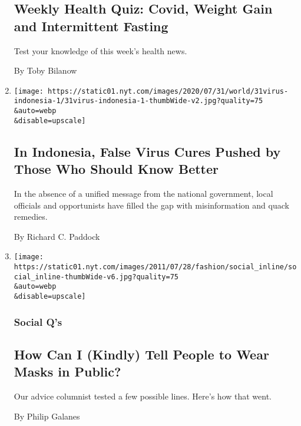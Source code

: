 \begin{enumerate}
  \hypertarget{weekly-health-quiz-covid-weight-gain-and-intermittent-fasting-1}{%
  \subsection{Weekly Health Quiz: Covid, Weight Gain and Intermittent
  Fasting}\label{weekly-health-quiz-covid-weight-gain-and-intermittent-fasting-1}}

  Test your knowledge of this week's health news.

  By Toby Bilanow
\item
  \href{/2020/07/31/world/asia/indonesia-coronavirus.html}{}

  \texttt{[image: https://static01.nyt.com/images/2020/07/31/world/31virus-indonesia-1/31virus-indonesia-1-thumbWide-v2.jpg?quality=75\\\&auto=webp\\\&disable=upscale]}

  \hypertarget{in-indonesia-false-virus-cures-pushed-by-those-who-should-know-better}{%
  \subsection{In Indonesia, False Virus Cures Pushed by Those Who Should
  Know
  Better}\label{in-indonesia-false-virus-cures-pushed-by-those-who-should-know-better}}

  In the absence of a unified message from the national government,
  local officials and opportunists have filled the gap with
  misinformation and quack remedies.

  By Richard C. Paddock
\item
  \href{/2020/07/30/style/masks-in-public-coronavirus.html}{}

  \texttt{[image: https://static01.nyt.com/images/2011/07/28/fashion/social\_inline/social\_inline-thumbWide-v6.jpg?quality=75\\\&auto=webp\\\&disable=upscale]}

  \hypertarget{social-qs}{%
  \subsubsection{Social Q's}\label{social-qs}}

  \hypertarget{how-can-i-kindly-tell-people-to-wear-masks-in-public}{%
  \subsection{How Can I (Kindly) Tell People to Wear Masks in
  Public?}\label{how-can-i-kindly-tell-people-to-wear-masks-in-public}}

  Our advice columnist tested a few possible lines. Here's how that
  went.

  By Philip Galanes
\end{enumerate}

